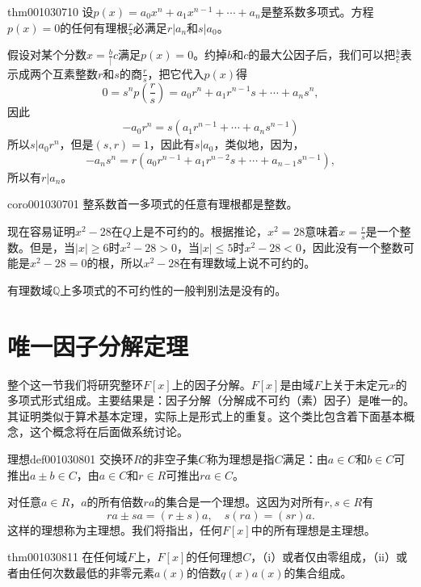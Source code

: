 \begin{theorem}{}{thm001030710}
设$p(x)=a_0x^n+a_1x^{n-1}+\cdots+a_n$是整系数多项式。方程$p(x)=0$的任何有理根$\frac{r}{s}$必满足$r|a_n$和$s|a_0$。
\end{theorem}

假设对某个分数$x=\frac{b}|{c}$满足$p(x)=0$。约掉$b$和$c$的最大公因子后，我们可以把$\frac{b}{c}$表示成两个互素整数$r$和$s$的商$\frac{r}{s}$，把它代入$p(x)$得
\begin{equation}\label{equ001030712}
0 = s^np(\frac{r}{s}) = a_0r^n + a_1r^{n-1}s+\cdots+a_ns^n,
\end{equation}
因此
\[
-a_0r^n = s(a_1r^{n-1}+\cdots+a_ns^{n-1})
\]
所以$s|a_0r^n$，但是$(s, r)=1$，因此有$s|a_0$，类似地，因为，
\[
-a_ns^n = r(a_0r^{n-1} + a_1r^{n-2}s+\cdots+a_{n-1}s^{n-1}),
\]
所以有$r|a_n$。

\begin{corollary}{}{coro001030701}
整系数首一多项式的任意有理根都是整数。
\end{corollary}

现在容易证明$x^2-28$在$Q$上是不可约的。根据推论，$x^2=28$意味着$x = \frac{r}{s}$是一个整数。但是，当$|x| \ge 6$时$x^2-28>0$，当$|x| \le 5$时$x^2-28<0$，因此没有一个整数可能是$x^2-28=0$的根，所以$x^2-28$在有理数域上说不可约的。

有理数域$\mathbb{Q}$上多项式的不可约性的一般判别法是没有的。


\section{唯一因子分解定理}\label{subsection0010308}
整个这一节我们将研究整环$F[x]$上的因子分解。$F[x]$是由域$F$上关于未定元$x$的多项式形式组成。主要结果是：因子分解（分解成不可约（素）因子）是唯一的。其证明类似于算术基本定理，实际上是形式上的重复。这个类比包含着下面基本概念，这个概念将在后面做系统讨论。

\begin{definition}{理想}{def001030801}
交换环$R$的非空子集$C$称为理想是指$C$满足：由$a \in C$和$b \in C$可推出$a \pm b \in C$，由$a \in C$和$r \in R$可推出$ra \in C$。
\end{definition}

对任意$a \in R$，$a$的所有倍数$ra$的集合是一个理想。这因为对所有$r, s \in R$有
\[
ra \pm sa = (r \pm s)a, \quad s(ra) = (sr)a.
\]
这样的理想称为主理想。我们将指出，任何$F[x]$中的所有理想是主理想。
\begin{theorem}{}{thm001030811}
在任何域$F$上，$F[x]$的任何理想$C$，（i）或者仅由零组成，（ii）或者由任何次数最低的非零元素$a(x)$的倍数$q(x)a(x)$的集合组成。
\end{theorem}

